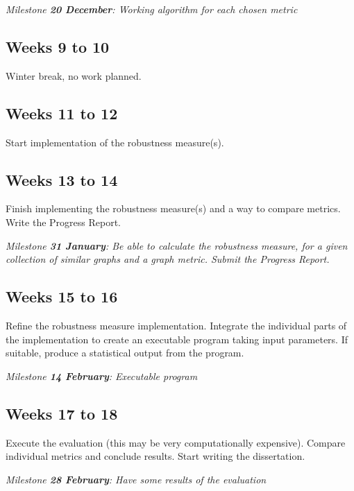 \documentclass[12pt,a4paper,twoside]{article}
\begin{document}
		\textit{Milestone \textbf{20 December}: Working algorithm for each chosen metric}
		
    \subsection*{Weeks 9 to 10}
	
		Winter break, no work planned.
		
	
	\subsection*{Weeks 11 to 12}
	
		Start implementation of the robustness measure(s).
		
		
	\subsection*{Weeks 13 to 14}
	
		Finish implementing the robustness measure(s) and a way to compare metrics. Write the Progress Report.
		
		\textit{Milestone \textbf{31 January}: Be able to calculate the robustness measure, for a given collection of similar graphs and a graph metric. Submit the Progress Report.}
	
	\subsection*{Weeks 15 to 16}
	
		Refine the robustness measure implementation. Integrate the individual parts of the implementation to create an executable program taking input parameters. If suitable, produce a statistical output from the program.
		
		\textit{Milestone \textbf{14 February}: Executable program}

	\subsection*{Weeks 17 to 18}
		
		Execute the evaluation (this may be very computationally expensive). Compare individual metrics and conclude results. Start writing the dissertation.
		
		\textit{Milestone \textbf{28 February}: Have some results of the evaluation}
\end{document}
